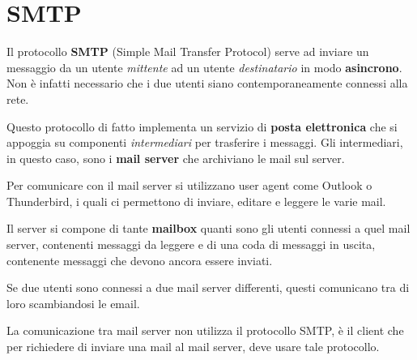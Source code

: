 \section{SMTP}
Il protocollo \textbf{SMTP} (Simple Mail Transfer Protocol) serve ad 
inviare un messaggio da un utente \emph{mittente} ad un utente 
\emph{destinatario} in modo \textbf{asincrono}. Non è infatti 
necessario che i due utenti siano contemporaneamente connessi alla 
rete.

Questo protocollo di fatto implementa un servizio di \textbf{posta
elettronica} che si appoggia su componenti \emph{intermediari} per 
trasferire i messaggi. Gli intermediari, in questo caso, sono i
\textbf{mail server} che archiviano le mail sul server.

Per comunicare con il mail server si utilizzano user agent come Outlook
o Thunderbird, i quali ci permettono di inviare, editare e leggere le 
varie mail.

Il server si compone di tante \textbf{mailbox} quanti sono gli utenti 
connessi a quel mail server, contenenti messaggi da leggere e di una 
coda di  messaggi in uscita, contenente messaggi che devono ancora
essere inviati.

Se due utenti sono connessi a due mail server differenti, questi 
comunicano tra di loro scambiandosi le email.

La comunicazione tra mail server non utilizza il protocollo SMTP, è il 
client che per richiedere di inviare una mail al mail server, deve 
usare tale protocollo.

